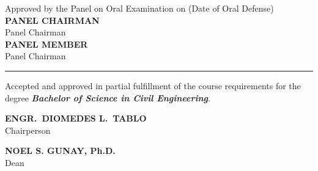 {	\begin{center}
		Approved by the Panel on Oral Examination on (Date of Oral Defense)\\[2cm]
		\textbf{PANEL CHAIRMAN}\\
		{\footnotesize Panel Chairman}\\
		\vspace*{2cm}
		\textbf{PANEL MEMBER}\\
		\footnotesize Panel Chairman
	\end{center}
	\vspace*{1cm}
	\hrule
	\vspace*{0.5cm}
	Accepted and approved in partial fulfillment of the course requirements for the degree {\slshape \bfseries Bachelor of Science in Civil Engineering}.

	\vspace*{1cm}
	\begin{multicols}{2}
		\begin{center}
			\textbf{ENGR.\ DIOMEDES L.\ TABLO}\\
			\footnotesize Chairperson
		\end{center}
		\columnbreak
		\begin{center}
			\textbf{NOEL S. GUNAY, Ph.D.}\\
			\footnotesize Dean
		\end{center}
	\end{multicols}
}
